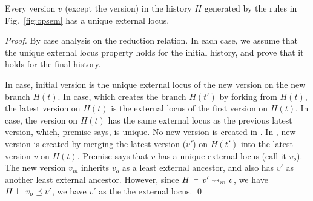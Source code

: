 \begin{lemma} 
Every version $v$ (except the  version) in the history $H$
generated by the rules in Fig.~\ref{fig:opsem} has a unique external
locus.
\end{lemma}
\begin{proof}
By case analysis on the reduction relation. In each case, we assume
that the unique external locus property holds for the initial history,
and prove that it holds for the final history.

In  case, initial version is the unique external locus of
the new version on the new branch $H(t)$. In  case,
which creates the branch $H(t')$ by forking from $H(t)$, the latest
version on $H(t)$ is the external locus of the first version on
$H(t)$. In  case, the version on $H(t)$ has the same
external locus as the previous latest version, which, premise says, is
unique. No new version is created in . In
, new version is created by merging the latest
version ($v'$) on $H(t')$ into the latest version $v$ on $H(t)$.
Premise says that $v$ has a unique external locus (call it $v_o$). The
new version $v_m$ inherits $v_o$ as a least external ancestor, and
also has $v'$ as another least external ancestor. However, since
$H\,\vdash\,v' \rightsquigarrow_m v$, we have $H\,\vdash\,v_o \preceq v'$, we
have $v'$ as the the external locus.
\qed
\end{proof}


